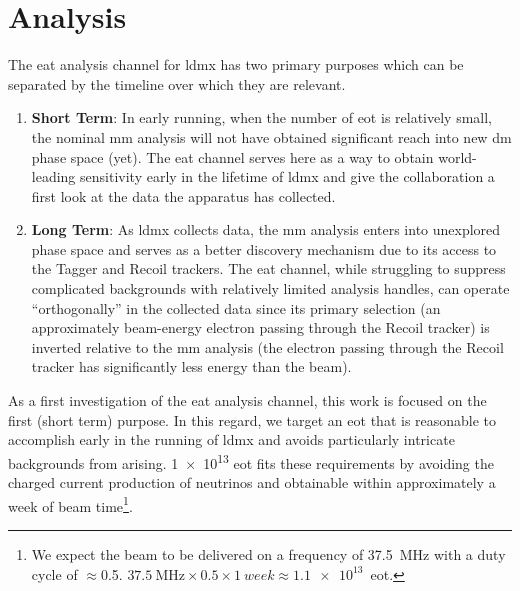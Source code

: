 \chapter{Analysis}
\label{chapter:ldmx:analysis}

The \ac{eat} analysis channel for \ac{ldmx} has two primary purposes which can
be separated by the timeline over which they are relevant.
\begin{enumerate}
	\item \textbf{Short Term}: In early running, when the number of \ac{eot} is
	      relatively small, the nominal \ac{mm} analysis will not have obtained
	      significant reach into new \ac{dm} phase space (yet). The \ac{eat} channel
	      serves here as a way to obtain world-leading sensitivity early in the lifetime
	      of \ac{ldmx} and give the collaboration a first look at the data the apparatus
	      has collected.
	\item \textbf{Long Term}: As \ac{ldmx} collects data, the \ac{mm}
	      analysis enters into unexplored phase space and serves as a better discovery
	      mechanism due to its access to the Tagger and Recoil trackers. The \ac{eat}
	      channel, while struggling to suppress complicated backgrounds with relatively
	      limited analysis handles, can operate ``orthogonally'' in the collected data
	      since its primary selection (an approximately beam-energy electron passing
	      through the Recoil tracker) is inverted relative to the \ac{mm} analysis
	      (the electron passing through the Recoil tracker has significantly less
	      energy than the beam).
\end{enumerate}
As a first investigation of the \ac{eat} analysis channel, this work is focused on
the first (short term) purpose. In this regard, we target an \ac{eot} that is reasonable
to accomplish early in the running of \ac{ldmx} and avoids particularly intricate backgrounds
from arising. \num{1e13} \ac{eot} fits these requirements by avoiding the charged current production
of neutrinos and obtainable within approximately a week of beam time\footnote{
	We expect the beam to be delivered on a frequency of \qty{37.5}{\mega\hertz} with a
	duty cycle of $\approx$\num{0.5}.
	$\qty{37.5}{\mega\hertz}\times0.5\times\qty{1}{week}\approx\num{1.1e13}$~\ac{eot}.
}.
